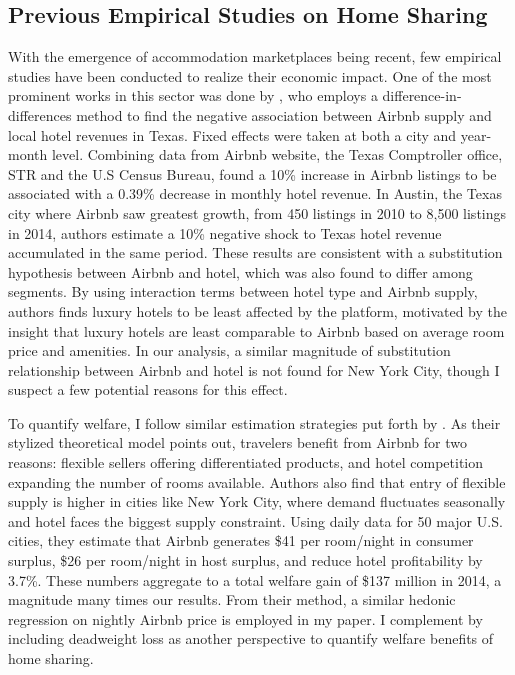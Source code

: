 \documentclass[12pt]{article}
\begin{document}
		\subsection{Previous Empirical Studies on Home Sharing}
			With the emergence of accommodation marketplaces being recent, few empirical studies have been conducted to realize their economic impact. One of the most prominent works in this sector was done by \citet{zervas2017rise}, who employs a difference-in-differences method to find the negative association between Airbnb supply and local hotel revenues in Texas. Fixed effects were taken at both a city and year-month level. Combining data from Airbnb website, the Texas Comptroller office, STR and the U.S Census Bureau, \citet{zervas2017rise} found a 10\% increase in Airbnb listings to be associated with a 0.39\% decrease in monthly hotel revenue. In Austin, the Texas city where Airbnb saw greatest growth, from 450 listings in 2010 to 8,500 listings in 2014, authors estimate a 10\% negative shock to Texas hotel revenue accumulated in the same period. These results are consistent with a substitution hypothesis between Airbnb and hotel, which was also found to differ among segments. By using interaction terms between hotel type and Airbnb supply, authors finds luxury hotels to be least affected by the platform, motivated by the insight that luxury hotels are least comparable to Airbnb based on average room price and amenities. In our analysis, a similar magnitude of substitution relationship between Airbnb and hotel is not found for New York City, though I suspect a few potential reasons for this effect.
			
			\par
			To quantify welfare, I follow similar estimation strategies put forth by \citet{farronato2018welfare}. As their stylized theoretical model points out, travelers benefit from Airbnb for two reasons: flexible sellers offering differentiated products, and hotel competition expanding the number of rooms available. Authors also find that entry of flexible supply is higher in cities like New York City, where demand fluctuates seasonally and hotel faces the biggest supply constraint.  Using daily data for 50 major U.S. cities, they estimate that Airbnb generates \$41 per room/night in consumer surplus, \$26 per room/night in host surplus, and reduce hotel profitability by 3.7\%. These numbers aggregate to a total welfare gain of \$137 million in 2014, a magnitude many times our results. From their method, a similar hedonic regression on nightly Airbnb price is employed in my paper. I complement \citet{farronato2018welfare} by including deadweight loss as another perspective to quantify welfare benefits of home sharing.
			
\end{document}
